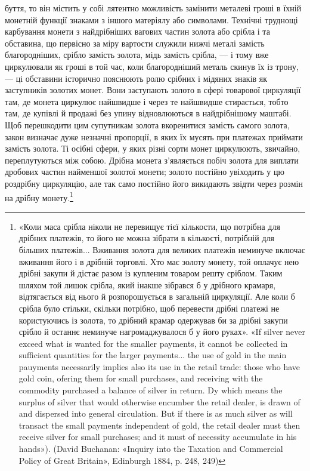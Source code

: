 \parcont{}  %
буття, то він містить у собі лятентно можливість замінити металеві
гроші в їхній монетній функції знаками з іншого матеріялу або
символами. Технічні труднощі карбування монети з найдрібніших
вагових частин золота або срібла і та обставина, що первісно
за міру вартости служили нижчі металі замість благородніших,
срібло замість золота, мідь замість срібла, — і тому вже циркулювали
як гроші в той час, коли благородніший металь скинув
їх із трону, — ці обставини історично пояснюють ролю срібних
і мідяних знаків як заступників золотих монет. Вони заступають
золото в сфері товарової циркуляції там, де монета циркулює
найшвидше і через те найшвидше стирається, тобто там, де купівлі
й продажі без упину відновлюються в найдрібнішому
маштабі. Щоб перешкодити цим супутникам золота вкоренитися
замість самого золота, закон визначає дуже незначні пропорції,
в яких їх мусять при платежах приймати замість золота. Ті осібні
сфери, у яких різні сорти монет циркулюють, звичайно, переплутуються
між собою. Дрібна монета з’являється побіч золота
для виплати дробових частин найменшої золотої монети; золото
постійно увіходить у цю роздрібну циркуляцію, але так само
постійно його викидають звідти через розмін на дрібну монету.\footnote{
«Коли маса срібла ніколи не перевищує тієї кількости, що потрібна
для дрібних платежів, то його не можна зібрати в кількості, потрібній
для більших платежів... Вживання золота для великих платежів неминуче
включає вживання його і в дрібній торговлі. Хто має золоту монету, той
оплачує нею дрібні закупи й дістає разом із купленим товаром решту
сріблом. Таким шляхом той лишок срібла, який інакше зібрався б у дрібного
крамаря, відтягається від нього й розпорошується в загальній циркуляції.
Але коли б срібла було стільки, скільки потрібно, щоб перевести
дрібні платежі не користуючись із золота, то дрібний крамар одержував
би за дрібні закупи срібло й останнє неминуче нагромаджувалося б у
його руках». «If silver never exceed what is wanted for the smaller payments,
it cannot be collected in sufficient quantities for the larger payments...
the use of gold in the main pauyments necessarily implies also
its use in the retail trade: those who have gold coin, ofering them for small
purchases, and receiving with the commodity purchased a balance of silver
in return. Dy which means the surplus of silver that would otherwise encumber
the retail dealer, is drawn of and dispersed into general circulation.
But if there is as much silver as will transact the small payments independent
of gold, the retail dealer must then receive silver for small purchases; and
it must of necessity accumulate in his hands»). (David Buchanan: «Inquiry
into the Taxation and Commercial Policy of Great Britain», Edinburgh
1884, p. 248, 249)
}

